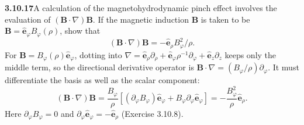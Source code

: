 \par\bigskip
\noindent\textbf{3.10.17}\quad A calculation of the magnetohydrodynamic pinch
effect involves the evaluation of $(\mathbf{B}\cdot\nabla)\mathbf{B}$. If the
magnetic induction $\mathbf{B}$ is taken to be
$\mathbf{B}=\hat{\mathbf{e}}_{\varphi}B_{\varphi}(\rho)$, show that
\[
(\mathbf{B}\cdot\nabla)\mathbf{B}
=-\hat{\mathbf{e}}_{\rho}B_{\varphi}^{2}/\rho.
\]
\solution
For $\mathbf B=B_\varphi(\rho)\hat{\mathbf e}_\varphi$, dotting into
$\nabla=\hat{\mathbf e}_\rho\partial_\rho
+\hat{\mathbf e}_\varphi\rho^{-1}\partial_\varphi+\hat{\mathbf e}_z\partial_z$
keeps only the middle term, so
the directional derivative operator is
$\mathbf B\cdot\nabla=(B_\varphi/\rho)\partial_\varphi$.
It must differentiate the basis as well as the scalar component:
\[
(\mathbf B\cdot\nabla)\mathbf B
=\frac{B_\varphi}{\rho}
\left[(\partial_\varphi B_\varphi)\hat{\mathbf e}_\varphi+
B_\varphi\partial_\varphi\hat{\mathbf e}_\varphi\right]
=\boxed{-\frac{B_\varphi^2}{\rho}\hat{\mathbf e}_\rho}.
\]
Here $\partial_\varphi B_\varphi=0$ and
$\partial_\varphi\hat{\mathbf e}_\varphi=-\hat{\mathbf e}_\rho$
(Exercise 3.10.8).

